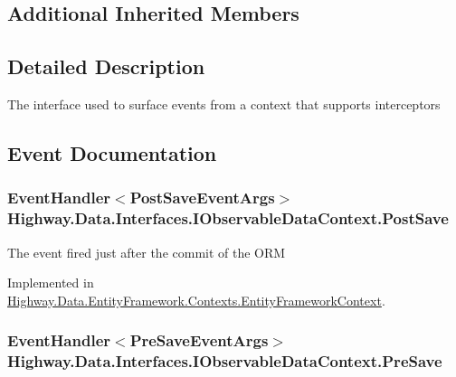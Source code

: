 \subsection*{Additional Inherited Members}


\subsection{Detailed Description}
The interface used to surface events from a context that supports interceptors 



\subsection{Event Documentation}
\hypertarget{interface_highway_1_1_data_1_1_interfaces_1_1_i_observable_data_context_a1978b914f7b94a37a6e86f3314326ca9}{
\subsubsection[{Post\-Save}]{\setlength{\rightskip}{0pt plus 5cm}Event\-Handler$<${\bf Post\-Save\-Event\-Args}$>$ Highway.\-Data.\-Interfaces.\-I\-Observable\-Data\-Context.\-Post\-Save}}\label{interface_highway_1_1_data_1_1_interfaces_1_1_i_observable_data_context_a1978b914f7b94a37a6e86f3314326ca9}


The event fired just after the commit of the O\-R\-M 



Implemented in \hyperlink{class_highway_1_1_data_1_1_entity_framework_1_1_contexts_1_1_entity_framework_context_a2297153144a3e1240cb4526eb963b889}{Highway.\-Data.\-Entity\-Framework.\-Contexts.\-Entity\-Framework\-Context}.

\hypertarget{interface_highway_1_1_data_1_1_interfaces_1_1_i_observable_data_context_add85ecbc05ebf7174003841bdbd72dfe}{
\subsubsection[{Pre\-Save}]{\setlength{\rightskip}{0pt plus 5cm}Event\-Handler$<${\bf Pre\-Save\-Event\-Args}$>$ Highway.\-Data.\-Interfaces.\-I\-Observable\-Data\-Context.\-Pre\-Save}}\label{interface_highway_1_1_data_1_1_interfaces_1_1_i_observable_data_context_add85ecbc05ebf7174003841bdbd72dfe}


